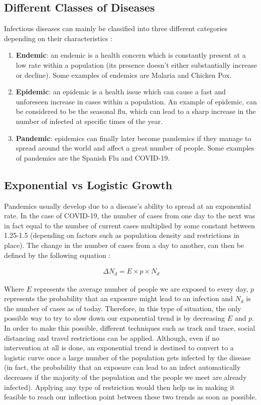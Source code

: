 \subsection{Different Classes of Diseases}
Infectious diseases can mainly be classified into three different categories depending on their characteristics \cite{2minclass}:
\begin{enumerate}
    \item \textbf{Endemic}: an endemic is a health concern which is constantly present at a low rate within a population (its presence doesn't either substantially increase or decline). Some examples of endemics are Malaria and Chicken Pox.
    \item \textbf{Epidemic}: an epidemic is a health issue which can cause a fast and unforeseen increase in cases within a population. An example of epidemic, can be considered to be the seasonal flu, which can lead to a sharp increase in the number of infected at specific times of the year.
    \item \textbf{Pandemic}: epidemics can finally later become pandemics if they manage to spread around the world and affect a great number of people. Some examples of pandemics are the Spanish Flu and COVID-19.
\end{enumerate}

\subsection{Exponential vs Logistic Growth}
\label{explog}
Pandemics usually develop due to a disease's ability to spread at an exponential rate. In the case of COVID-19, the number of cases from one day to the next was in fact equal to the number of current cases multiplied by some constant between 1.25-1.5 (depending on factors such as population density and restrictions in place). The change in the number of cases from a day to another, can then be defined by the following equation \cite{exponentials}:

\useshortskip
\begin{align}
\ \Delta N_{d} = E \times p \times N_{d}
\label{n_new}
\end{align}
\useshortskip

Where $E$ represents the average number of people we are exposed to every day, $p$ represents the probability that an exposure might lead to an infection and $N_{d}$ is the number of cases as of today. Therefore, in this type of situation, the only possible way to try to slow down our exponential trend is by decreasing $E$ and $p$. In order to make this possible, different techniques such as track and trace, social distancing and travel restrictions can be applied. Although, even if no intervention at all is done, an exponential trend is destined to convert to a logistic curve once a large number of the population gets infected by the disease (in fact, the probability that an exposure can lead to an infect automatically decreases if the majority of the population and the people we meet are already infected). Applying any type of restriction would then help us in making it feasible to reach our inflection point between these two trends as soon as possible.

